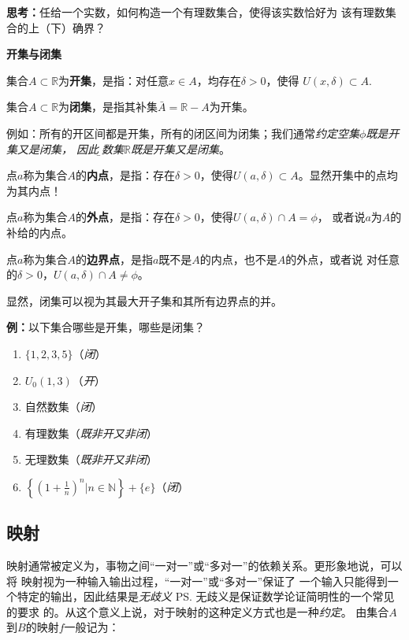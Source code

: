 	{\bf 思考：}任给一个实数，如何构造一个有理数集合，使得该实数恰好为
	该有理数集合的上（下）确界？
	
	\begin{shaded}
	{\bf 开集与闭集}
	
	集合$A\subset\mathbb{R}$为{\bf 开集}，是指：对任意$x\in A$，均存在$\delta>0$，使得
	$U(x,\delta)\subset A.$
	
	集合$A\subset\mathbb{R}$为{\bf 闭集}，是指其补集$\bar{A}=\mathbb{R}-A$为开集。
	
	例如：所有的开区间都是开集，所有的闭区间为闭集；我们通常{\it 约定空集$\phi$既是开集又是闭集，
	因此{\b 实数集$\mathbb{R}$既是开集又是闭集}}。
	
	点$a$称为集合$A$的{\bf 内点}，是指：存在$\delta>0$，使得$U(a,\delta)\subset A$。显然开集中的点均为其内点！
	
	点$a$称为集合$A$的{\bf 外点}，是指：存在$\delta>0$，使得$U(a,\delta)\cap A=\phi$，
	或者说$a$为$A$的补给的内点。
	
	点$a$称为集合$A$的{\bf 边界点}，是指$a$既不是$A$的内点，也不是$A$的外点，或者说
	对任意的$\delta>0$，$U(a,\delta)\cap A\ne\phi$。
	
	显然，闭集可以视为其最大开子集和其所有边界点的并。
	
	{\bf 例：}以下集合哪些是开集，哪些是闭集？
	\begin{enumerate}[(1)]
	  \setlength{\itemindent}{1cm}
	  \item $\{1,2,3,5\}$\quad\quad（{\it 闭}）
	  \item $U_0(1,3)$\quad\quad（{\it 开}）
	  \item 自然数集\quad\quad（{\it 闭}）
	  \item 有理数集\quad\quad（{\it 既非开又非闭}）
	  \item 无理数集\quad\quad（{\it 既非开又非闭}）
	  \item $\left\{\left(1+\frac
	  1n\right)^n|n\in\mathbb{N}\right\}+\{e\}$\quad\quad（{\it 闭}）
	\end{enumerate}
	
	\end{shaded}

\subsection{映射}

映射通常被定义为，事物之间“一对一”或“多对一”的依赖关系。更形象地说，可以将
映射视为一种输入输出过程，“一对一”或“多对一”保证了
一个输入只能得到一个特定的输出，因此结果是{\it 无歧义}
\ps{无歧义是保证数学论证简明性的一个常见的要求}
的。从这个意义上说，对于映射的这种定义方式也是一种{\it 约定}。
由集合$A$到$B$的映射$f$一般记为：

